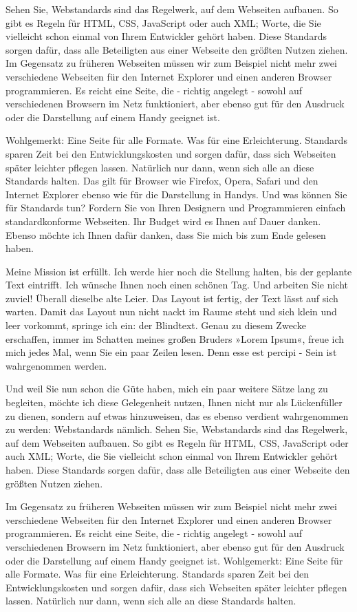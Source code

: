 Sehen Sie, Webstandards sind das Regelwerk, auf dem Webseiten aufbauen. So gibt es Regeln für HTML, CSS, JavaScript oder auch XML; Worte, die Sie vielleicht schon einmal von Ihrem Entwickler gehört haben. Diese Standards sorgen dafür, dass alle Beteiligten aus einer Webseite den größten Nutzen ziehen. Im Gegensatz zu früheren Webseiten müssen wir zum Beispiel nicht mehr zwei verschiedene Webseiten für den Internet Explorer und einen anderen Browser programmieren. Es reicht eine Seite, die - richtig angelegt - sowohl auf verschiedenen Browsern im Netz funktioniert, aber ebenso gut für den Ausdruck oder die Darstellung auf einem Handy geeignet ist.

Wohlgemerkt: Eine Seite für alle Formate. Was für eine Erleichterung. Standards sparen Zeit bei den Entwicklungskosten und sorgen dafür, dass sich Webseiten später leichter pflegen lassen. Natürlich nur dann, wenn sich alle an diese Standards halten. Das gilt für Browser wie Firefox, Opera, Safari und den Internet Explorer ebenso wie für die Darstellung in Handys. Und was können Sie für Standards tun? Fordern Sie von Ihren Designern und Programmieren einfach standardkonforme Webseiten. Ihr Budget wird es Ihnen auf Dauer danken. Ebenso möchte ich Ihnen dafür danken, dass Sie mich bis zum Ende gelesen haben.

Meine Mission ist erfüllt. Ich werde hier noch die Stellung halten, bis der geplante Text eintrifft. Ich wünsche Ihnen noch einen schönen Tag. Und arbeiten Sie nicht zuviel! Überall dieselbe alte Leier. Das Layout ist fertig, der Text lässt auf sich warten. Damit das Layout nun nicht nackt im Raume steht und sich klein und leer vorkommt, springe ich ein: der Blindtext. Genau zu diesem Zwecke erschaffen, immer im Schatten meines großen Bruders »Lorem Ipsum«, freue ich mich jedes Mal, wenn Sie ein paar Zeilen lesen. Denn esse est percipi - Sein ist wahrgenommen werden.

Und weil Sie nun schon die Güte haben, mich ein paar weitere Sätze lang zu begleiten, möchte ich diese Gelegenheit nutzen, Ihnen nicht nur als Lückenfüller zu dienen, sondern auf etwas hinzuweisen, das es ebenso verdient wahrgenommen zu werden: Webstandards nämlich. Sehen Sie, Webstandards sind das Regelwerk, auf dem Webseiten aufbauen. So gibt es Regeln für HTML, CSS, JavaScript oder auch XML; Worte, die Sie vielleicht schon einmal von Ihrem Entwickler gehört haben. Diese Standards sorgen dafür, dass alle Beteiligten aus einer Webseite den größten Nutzen ziehen.

Im Gegensatz zu früheren Webseiten müssen wir zum Beispiel nicht mehr zwei verschiedene Webseiten für den Internet Explorer und einen anderen Browser programmieren. Es reicht eine Seite, die - richtig angelegt - sowohl auf verschiedenen Browsern im Netz funktioniert, aber ebenso gut für den Ausdruck oder die Darstellung auf einem Handy geeignet ist. Wohlgemerkt: Eine Seite für alle Formate. Was für eine Erleichterung. Standards sparen Zeit bei den Entwicklungskosten und sorgen dafür, dass sich Webseiten später leichter pflegen lassen. Natürlich nur dann, wenn sich alle an diese Standards halten.

